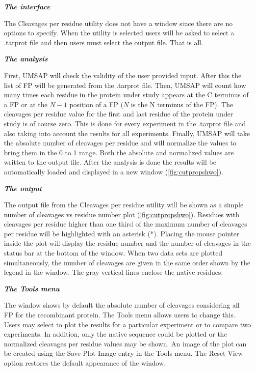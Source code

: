 \textit{\textbf{The interface}}

The Cleavages per residue utility does not have a window since there are no options to specify. When the utility is selected users will be asked to select a .tarprot file and then users must select the output file. That is all.

\textit{\textbf{The analysis}}

First, UMSAP will check the validity of the user provided input. After this the list of FP will be generated from the .tarprot file. Then, UMSAP will count how many times each residue in the protein under study appears at the C terminus of a FP or at the \(N-1\) position of a FP (\(N\) is the N terminus of the FP). The cleavages per residue value for the first and last residue of the protein under study is of course zero. This is done for every experiment in the .tarprot file and also taking into account the results for all experiments. Finally, UMSAP will take the absolute number of cleavages per residue and will normalize the values to bring them in the 0 to 1 range. Both the absolute and normalized values are written to the output file. After the analysis is done the results will be automatically loaded and displayed in a new window (\autoref{fig:cutpropshwo}). 

\textit{\textbf{The output}}

The output file from the Cleavages per residue utility will be shown as a simple number of cleavages vs residue number plot (\autoref{fig:cutpropshwo}). Residues with cleavages per residue higher than one third of the maximum number of cleavages per residue will be highlighted with an asterisk (*). Placing the mouse pointer inside the plot will display the residue number and the number of cleavages in the status bar at the bottom of the window. When two data sets are plotted simultaneously, the number of cleavages are given in the same order shown by the legend in the window. The gray vertical lines enclose the native residues. 

\textit{\textbf{The Tools menu}}

The window shows by default the absolute number of cleavages considering all FP for the recombinant protein. The Tools menu allows users to change this. Users may select to plot the results for a particular experiment or to compare two experiments. In addition, only the native sequence could be plotted or the normalized cleavages per residue values may be shown. An image of the plot can be created using the Save Plot Image entry in the Tools menu. The Reset View option restores the default appearance of the window.   

